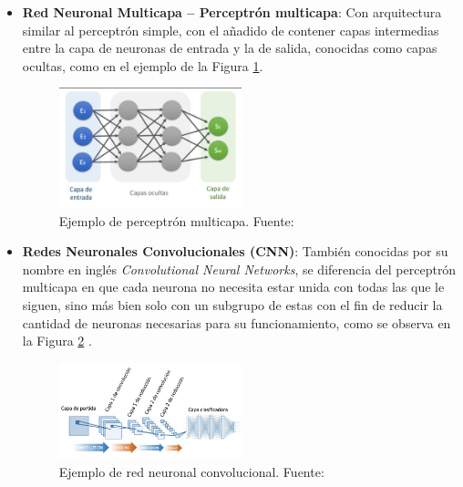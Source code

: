 \begin{itemize}
\begin{itemize}
		\item \textbf{Red Neuronal Multicapa – Perceptrón multicapa}: Con arquitectura similar al perceptrón simple, con el añadido de contener capas intermedias entre la capa de neuronas de entrada y la de salida, conocidas como capas ocultas, como en el ejemplo de la Figura \ref{2:fig21}.
		\begin{figure}[h]
			\begin{center}
				\includegraphics[width=0.50\textwidth]{2/figures/perceptron_multicapa.jpg}
				\caption[Ejemplo de perceptrón multicapa]{Ejemplo de perceptrón multicapa. Fuente: \cite{gl_calvo2017clasifrna}}
				\label{2:fig21}
			\end{center}
		\end{figure}
		
		\item \textbf{Redes Neuronales Convolucionales (CNN)}: También conocidas por su nombre en inglés \textit{Convolutional Neural Networks}, se diferencia del perceptrón multicapa en que cada neurona no necesita estar unida con todas las que le siguen, sino más bien solo con un subgrupo de estas con el fin de reducir la cantidad de neuronas necesarias para su funcionamiento, como se observa en la Figura \ref{2:fig22} \parencite{gl_calvo2017clasifrna}.
		\begin{figure}[h]
			\begin{center}
				\includegraphics[width=0.50\textwidth]{2/figures/cnn.jpg}
				\caption[Ejemplo de red neuronal convolucional]{Ejemplo de red neuronal convolucional. Fuente: \cite{gl_calvo2017clasifrna}}
				\label{2:fig22}
			\end{center}
		\end{figure}
		

\end{itemize}
\end{itemize}
